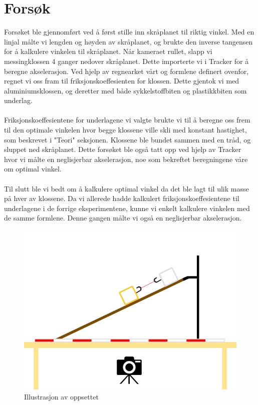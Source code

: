 \documentclass[10pt,a4paper]{report}
\begin{document}
\section*{Forsøk}
Forsøket ble gjennomført ved å først stille inn skråplanet til riktig vinkel. Med en linjal målte vi lengden og høyden av skråplanet, og brukte den inverse tangensen for å kalkulere vinkelen til skråplanet. Når kameraet rullet, slapp vi messingklossen 4 ganger nedover skråplanet. Dette importerte vi i Tracker for å beregne akselerasjon. Ved hjelp av regnearket vårt og formlene definert ovenfor, regnet vi oss fram til friksjonskoeffesienten for klossen. Dette gjentok vi med aluminiumsklossen, og deretter med både sykkelstoffbiten og plastikkbiten som underlag. \\
\\Friksjonskoeffesientene for underlagene vi valgte brukte vi til å beregne oss frem til den optimale vinkelen hvor begge klossene ville skli med konstant hastighet, som beskrevet i "Teori" seksjonen. Klossene ble bundet sammen med en tråd, og sluppet ned skråplanet. Dette forsøket ble også tatt opp ved hjelp av Tracker hvor vi målte en neglisjerbar akselerasjon, noe som bekreftet beregningene våre om optimal vinkel.\\
\\Til slutt ble vi bedt om å kalkulere optimal vinkel da det ble lagt til ulik masse på hver av klossene. Da vi allerede hadde kalkulert friksjonskoeffesientene til underlagene i de forrige eksperimentene, kunne vi enkelt kalkulere vinkelen med de samme formlene. Denne gangen målte vi også en neglisjerbar akselerasjon.

\begin{figure}
\centerline{\includegraphics[scale=0.5]{oppsett}}
\caption{Illustrasjon av oppsettet}
\label{oppsett}
\end{figure}
\end{document}
